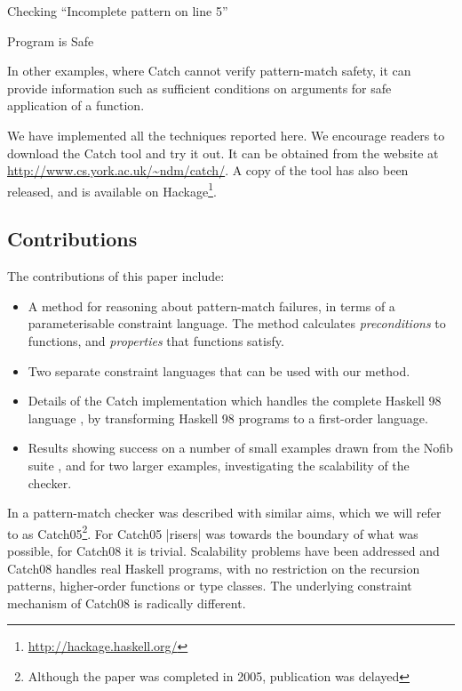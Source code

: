 \documentclass[preprint]{sigplanconf}
\begin{document}
\smallskip
\par\noindent\textsf{Checking ``Incomplete pattern on line 5''}
\par\noindent\textsf{Program is Safe}
\smallskip

In other examples, where Catch cannot verify pattern-match safety, it can provide information such as sufficient conditions on arguments for safe application of a function.

We have implemented all the techniques reported here. We encourage readers to download the Catch tool and try it out. It can be obtained from the website at \url{http://www.cs.york.ac.uk/~ndm/catch/}. A copy of the tool has also been released, and is available on Hackage\footnote{\url{http://hackage.haskell.org/}}.

\subsection{Contributions}

The contributions of this paper include:

\begin{itemize}
\item A method for reasoning about pattern-match failures, in terms of a parameterisable constraint language. The method calculates \textit{preconditions} to functions, and \textit{properties} that functions satisfy.
\item Two separate constraint languages that can be used with our method.
\item Details of the Catch implementation which handles the complete Haskell 98 language \cite{haskell}, by transforming Haskell 98 programs to a first-order language.
\item Results showing success on a number of small examples drawn from the Nofib suite \cite{nofib}, and for two larger examples, investigating the scalability of the checker.
\end{itemize}

In \citet{me:catch_tfp} a pattern-match checker was described with similar aims, which we will refer to as Catch05\footnote{Although the paper was completed in 2005, publication was delayed}. For Catch05 |risers| was towards the boundary of what was possible, for Catch08 it is trivial. Scalability problems have been addressed and Catch08 handles real Haskell programs, with no restriction on the recursion patterns, higher-order functions or type classes. The underlying constraint mechanism of Catch08 is radically different.
\end{document}
